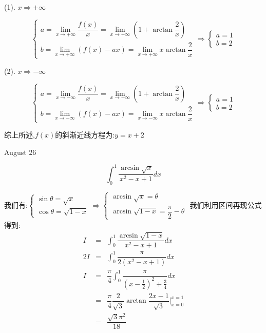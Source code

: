 \begin{solution}

	(1). $x\Rightarrow +\infty$
	
	$$\left\lbrace
	\begin{array}{l}
		a=\lim\limits_{x\to+\infty}\dfrac{f(x)}{x}=\lim\limits_{x\to+\infty}(1+\arctan\dfrac{2}{x})\\
		b=\lim\limits_{x\to+\infty}(f(x)-ax)=\lim\limits_{x\to+\infty}x\arctan\dfrac{2}{x}
	\end{array}
	\right. \Rightarrow \left\lbrace
	\begin{array}{l}
		a=1\\
		b=2
	\end{array}
	\right. $$
	
	(2). $x\Rightarrow -\infty$
	
	$$\left\lbrace
	\begin{array}{l}
		a=\lim\limits_{x\to-\infty}\dfrac{f(x)}{x}=\lim\limits_{x\to -\infty}(1+\arctan\dfrac{2}{x})\\
		b=\lim\limits_{x\to-\infty}(f(x)-ax)=\lim\limits_{x\to-\infty}x\arctan\dfrac{2}{x}
	\end{array}
	\right. \Rightarrow \left\lbrace
	\begin{array}{l}
		a=1\\
		b=2
	\end{array}
	\right. $$
	
	综上所述,$f(x)$的斜渐近线方程为:$y=x+2$
\end{solution}


\textcolor{purplea}{August 26}

\begin{example}[][Exam: 34.4.9]
	$$\int_{0}^{1}\dfrac{\arcsin\sqrt{x}}{x^2-x+1}dx$$
\end{example}

\begin{solution}

	我们有:$\left\lbrace
	\begin{array}{l}
		\sin\theta=\sqrt{x}\\
		\cos\theta=\sqrt{1-x}
	\end{array}
	\right. \Rightarrow \left\lbrace
	\begin{array}{l}
		\arcsin\sqrt{x}=\theta\\
		\arcsin\sqrt{1-x}=\dfrac{\pi}{2}-\theta
	\end{array}
	\right. $
	我们利用区间再现公式得到:  
	\begin{eqnarray*}
		I&=&\int_{0}^{1}\dfrac{\arcsin\sqrt{1-x}}{x^2-x+1}dx\\
		2I&=&\int_{0}^{1}\dfrac{\pi}{2(x^2-x+1)}dx\\
		I&=&\dfrac{\pi}{4}\int_{0}^{1}\dfrac{\pi}{(x-\frac{1}{2})^2+\frac{3}{4}}dx\\
		&=&\dfrac{\pi}{4}\dfrac{2}{\sqrt{3}}\arctan\dfrac{2x-1}{\sqrt{3}}|_{x=0}^{x=1}\\
		&=&\dfrac{\sqrt{3}\pi^2}{18}
	\end{eqnarray*}
\end{solution}


